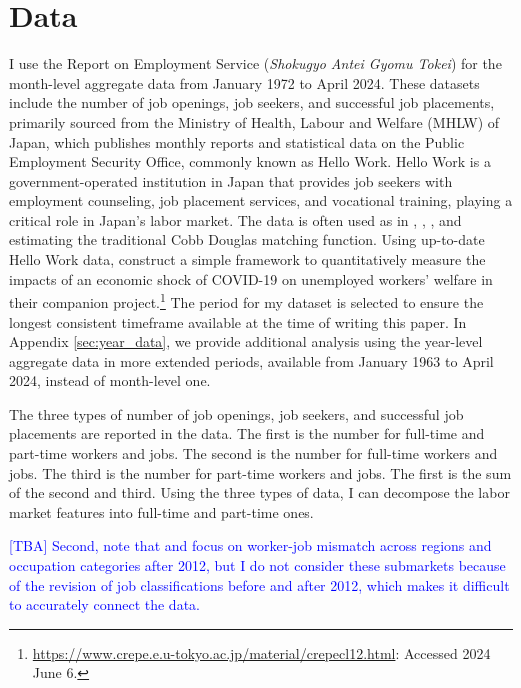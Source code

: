 \documentclass[12pt]{article}
\begin{document}

\section{Data}

I use the Report on Employment Service (\textit{Shokugyo Antei Gyomu Tokei}) for the month-level aggregate data from January 1972 to April 2024. 
These datasets include the number of job openings, job seekers, and successful job placements, primarily sourced from the Ministry of Health, Labour and Welfare (MHLW) of Japan, which publishes monthly reports and statistical data on the Public Employment Security Office, commonly known as Hello Work. 
Hello Work is a government-operated institution in Japan that provides job seekers with employment counseling, job placement services, and vocational training, playing a critical role in Japan's labor market. 
The data is often used as in \cite{kano2005estimating}, \cite{kambayashi2006vacancy}, \cite{sasaki2008matching}, and \cite{higashi2018spatial} estimating the traditional Cobb Douglas matching function.
Using up-to-date Hello Work data, \cite{kawata2021first} construct a simple framework to quantitatively measure the impacts of an economic shock of COVID-19 on unemployed workers’ welfare in their companion project.\footnote{\url{https://www.crepe.e.u-tokyo.ac.jp/material/crepecl12.html}: Accessed 2024 June 6.} 
The period for my dataset is selected to ensure the longest consistent timeframe available at the time of writing this paper.
In Appendix \ref{sec:year_data}, we provide additional analysis using the year-level aggregate data in more extended periods, available from January 1963 to April 2024, instead of month-level one.

The three types of number of job openings, job seekers, and successful job placements are reported in the data. 
The first is the number for full-time and part-time workers and jobs.
The second is the number for full-time workers and jobs.
The third is the number for part-time workers and jobs.
The first is the sum of the second and third.
Using the three types of data, I can decompose the labor market features into full-time and part-time ones.

\textcolor{blue}{[TBA] Second, note that \cite{kawata2019} and \cite{higashi2018spatial} focus on worker-job mismatch across regions and occupation categories after 2012, but I do not consider these submarkets because of the revision of job classifications before and after 2012, which makes it difficult to accurately connect the data.}
\end{document}
